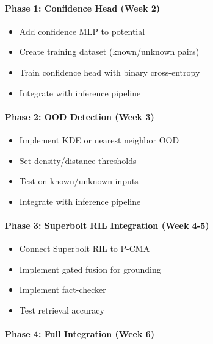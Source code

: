 \documentclass[
  11pt,
  a4paper,
]{article}
\providecommand{\tightlist}{%
  \setlength{\itemsep}{0pt}\setlength{\parskip}{0pt}}
\begin{document}
\paragraph{Phase 1: Confidence Head (Week
2)}\label{phase-1-confidence-head-week-2}

\begin{itemize}
\tightlist
\item[$\square$]
  Add confidence MLP to potential
\item[$\square$]
  Create training dataset (known/unknown pairs)
\item[$\square$]
  Train confidence head with binary cross-entropy
\item[$\square$]
  Integrate with inference pipeline
\end{itemize}

\paragraph{Phase 2: OOD Detection (Week
3)}\label{phase-2-ood-detection-week-3}

\begin{itemize}
\tightlist
\item[$\square$]
  Implement KDE or nearest neighbor OOD
\item[$\square$]
  Set density/distance thresholds
\item[$\square$]
  Test on known/unknown inputs
\item[$\square$]
  Integrate with inference pipeline
\end{itemize}

\paragraph{Phase 3: Superbolt RIL Integration (Week
4-5)}\label{phase-3-superbolt-ril-integration-week-4-5}

\begin{itemize}
\tightlist
\item[$\square$]
  Connect Superbolt RIL to P-CMA
\item[$\square$]
  Implement gated fusion for grounding
\item[$\square$]
  Implement fact-checker
\item[$\square$]
  Test retrieval accuracy
\end{itemize}

\paragraph{Phase 4: Full Integration (Week
6)}\label{phase-4-full-integration-week-6}
\end{document}
